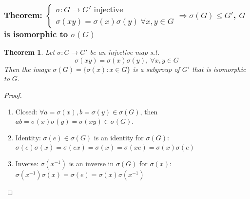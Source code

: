\documentclass[11pt,a4paper]{article}
\newtheorem{theorem}{Theorem}
\begin{document}
\subsubsection{Theorem: $\left\{\begin{matrix}
    \sigma: G \rightarrow G'\text{ injective}\\
    \sigma(xy)=\sigma(x)\sigma(y)\ \forall x,y\in G
\end{matrix}\right. \Rightarrow	\sigma(G)\leq G'$, $G$ is isomorphic to $\sigma(G)$}
\begin{theorem}
Let $\sigma: G \rightarrow G'$ be an injective map s.t. $$\sigma (xy)=\sigma(x)\sigma(y),\ \forall x,y\in G$$
Then the image $\sigma(G)=\{\sigma(x):x\in G\}$ is a subgroup of $G'$ that is isomorphic to $G$.
\end{theorem}
\begin{proof}
\quad\\
\begin{enumerate}
    \item Closed: $\forall a=\sigma(x),b=\sigma(y)\in \sigma(G)$, then $ab=\sigma(x)\sigma(y)=\sigma(xy)\in \sigma(G)$.
    \item Identity: $\sigma(e)\in \sigma(G)$ is an identity for $\sigma(G)$: $\sigma(e)\sigma(x)=\sigma(ex)=\sigma(x)=\sigma(xe)=\sigma(x)\sigma(e)$
    \item Inverse: $\sigma(x^{-1})$ is an inverse in $\sigma(G)$ for $\sigma(x)$: $\sigma(x^{-1})\sigma(x)=\sigma(e)=\sigma(x)\sigma(x^{-1})$
\end{enumerate}
\end{proof}
\end{document}
